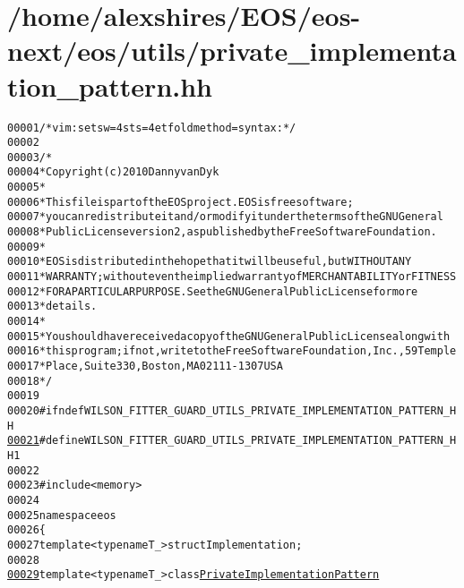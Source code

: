 \hypertarget{private__implementation__pattern_8hh_source}{
\section{/home/alexshires/EOS/eos-\/next/eos/utils/private\_\-implementation\_\-pattern.hh}
}


\begin{footnotesize}\begin{alltt}
00001 \textcolor{comment}{/* vim: set sw=4 sts=4 et foldmethod=syntax : */}
00002 
00003 \textcolor{comment}{/*}
00004 \textcolor{comment}{ * Copyright (c) 2010 Danny van Dyk}
00005 \textcolor{comment}{ *}
00006 \textcolor{comment}{ * This file is part of the EOS project. EOS is free software;}
00007 \textcolor{comment}{ * you can redistribute it and/or modify it under the terms of the GNU General}
00008 \textcolor{comment}{ * Public License version 2, as published by the Free Software Foundation.}
00009 \textcolor{comment}{ *}
00010 \textcolor{comment}{ * EOS is distributed in the hope that it will be useful, but WITHOUT ANY}
00011 \textcolor{comment}{ * WARRANTY; without even the implied warranty of MERCHANTABILITY or FITNESS}
00012 \textcolor{comment}{ * FOR A PARTICULAR PURPOSE.  See the GNU General Public License for more}
00013 \textcolor{comment}{ * details.}
00014 \textcolor{comment}{ *}
00015 \textcolor{comment}{ * You should have received a copy of the GNU General Public License along with}
00016 \textcolor{comment}{ * this program; if not, write to the Free Software Foundation, Inc., 59 Temple}
00017 \textcolor{comment}{ * Place, Suite 330, Boston, MA  02111-1307  USA}
00018 \textcolor{comment}{ */}
00019 
00020 \textcolor{preprocessor}{#ifndef WILSON\_FITTER\_GUARD\_UTILS\_PRIVATE\_IMPLEMENTATION\_PATTERN\_HH}
\hypertarget{private__implementation__pattern_8hh_source_l00021}{}\hyperlink{private__implementation__pattern_8hh_a5efbe66a4abd663a38be294484095169}{00021} \textcolor{preprocessor}{}\textcolor{preprocessor}{#define WILSON\_FITTER\_GUARD\_UTILS\_PRIVATE\_IMPLEMENTATION\_PATTERN\_HH 1}
00022 \textcolor{preprocessor}{}
00023 \textcolor{preprocessor}{#include <memory>}
00024 
00025 \textcolor{keyword}{namespace }eos
00026 \{
00027     \textcolor{keyword}{template} <\textcolor{keyword}{typename} T\_> \textcolor{keyword}{struct }Implementation;
00028 
\hypertarget{private__implementation__pattern_8hh_source_l00029}{}\hyperlink{classeos_1_1PrivateImplementationPattern}{00029}     \textcolor{keyword}{template} <\textcolor{keyword}{typename} T\_> \textcolor{keyword}{class }\hyperlink{classeos_1_1PrivateImplementationPattern}{PrivateImplementationPattern}

\end{alltt}
\end{footnotesize}
